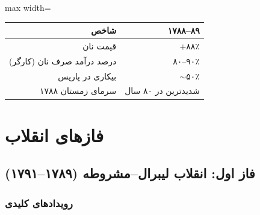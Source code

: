 \begin{tcolorbox}[enemybox, title={\rl{قحطی و گرانی}}]
\begin{center}
\begin{adjustbox}{max width=\linewidth}%
\begin{tabular}{rr}
\toprule
\rowcolor{AccentRed!15}
\color{AccentRed}\bfseries شاخص & \color{AccentRed}\bfseries ۱۷۸۸–۸۹ \\
\midrule
قیمت نان & $+$۸۸٪ \\
درصد درآمد صرف نان (کارگر) & ۸۰–۹۰٪ \\
بیکاری در پاریس & ${\sim}$۵۰٪ \\
سرمای زمستان ۱۷۸۸ & شدیدترین در ۸۰ سال \\
\bottomrule
\end{tabular}
\end{adjustbox}
\end{center}
\end{tcolorbox}

\newpage
{}%
\section{فازهای انقلاب}
\label{sec:phases}

\subsection{فاز اول: انقلاب لیبرال–مشروطه (۱۷۸۹–۱۷۹۱)}
\label{sec:phase1}

\subsubsection{رویدادهای کلیدی}


